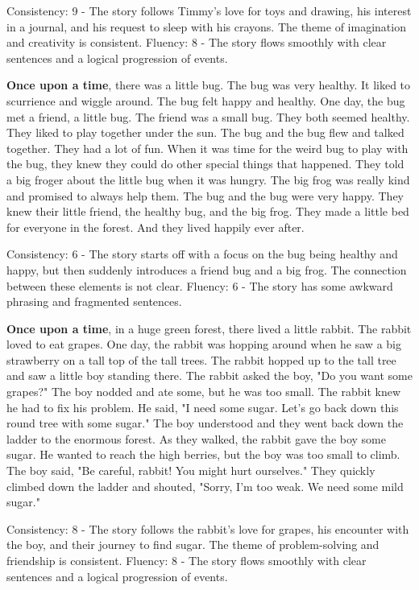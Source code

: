 \documentclass{article}
\begin{document}
Consistency: 9 - The story follows Timmy's love for toys and drawing, his interest in a journal, and his request to sleep with his crayons. The theme of imagination and creativity is consistent.
Fluency: 8 - The story flows smoothly with clear sentences and a logical progression of events.

\textbf{Once upon a time}, there was a little bug. The bug was very healthy. It liked to scurrience and wiggle around. The bug felt happy and healthy. One day, the bug met a friend, a little bug. The friend was a small bug. They both seemed healthy. They liked to play together under the sun. The bug and the bug flew and talked together. They had a lot of fun. When it was time for the weird bug to play with the bug, they knew they could do other special things that happened. They told a big froger about the little bug when it was hungry. The big frog was really kind and promised to always help them. The bug and the bug were very happy. They knew their little friend, the healthy bug, and the big frog. They made a little bed for everyone in the forest. And they lived happily ever after.

Consistency: 6 - The story starts off with a focus on the bug being healthy and happy, but then suddenly introduces a friend bug and a big frog. The connection between these elements is not clear.
Fluency: 6 - The story has some awkward phrasing and fragmented sentences.

\textbf{Once upon a time}, in a huge green forest, there lived a little rabbit. The rabbit loved to eat grapes. One day, the rabbit was hopping around when he saw a big strawberry on a tall top of the tall trees. The rabbit hopped up to the tall tree and saw a little boy standing there. The rabbit asked the boy, "Do you want some grapes?" The boy nodded and ate some, but he was too small. The rabbit knew he had to fix his problem. He said, "I need some sugar. Let's go back down this round tree with some sugar." The boy understood and they went back down the ladder to the enormous forest. As they walked, the rabbit gave the boy some sugar. He wanted to reach the high berries, but the boy was too small to climb. The boy said, "Be careful, rabbit! You might hurt ourselves." They quickly climbed down the ladder and shouted, "Sorry, I'm too weak. We need some mild sugar."

Consistency: 8 - The story follows the rabbit's love for grapes, his encounter with the boy, and their journey to find sugar. The theme of problem-solving and friendship is consistent.
Fluency: 8 - The story flows smoothly with clear sentences and a logical progression of events.
\end{document}
